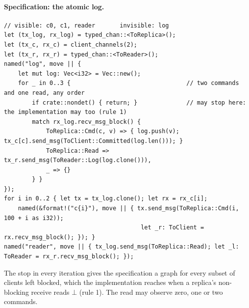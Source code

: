 \documentclass[11pt,a4paper]{article}
\begin{document}
\paragraph{Specification: the atomic log.}
\begin{lstlisting}
// visible: c0, c1, reader       invisible: log
let (tx_log, rx_log) = typed_chan::<ToReplica>();
let (tx_c, rx_c) = client_channels(2);
let (tx_r, rx_r) = typed_chan::<ToReader>();
named("log", move || {
    let mut log: Vec<i32> = Vec::new();
    for _ in 0..3 {                                 // two commands and one read, any order
        if crate::nondet() { return; }              // may stop here: the implementation may too (rule 1)
        match rx_log.recv_msg_block() {
            ToReplica::Cmd(c, v) => { log.push(v); tx_c[c].send_msg(ToClient::Committed(log.len())); }
            ToReplica::Read => tx_r.send_msg(ToReader::Log(log.clone())),
            _ => {}
        } }
});
for i in 0..2 { let tx = tx_log.clone(); let rx = rx_c[i];
    named(&format!("c{i}"), move || { tx.send_msg(ToReplica::Cmd(i, 100 + i as i32));
                                       let _r: ToClient = rx.recv_msg_block(); }); }
named("reader", move || { tx_log.send_msg(ToReplica::Read); let _l: ToReader = rx_r.recv_msg_block(); });
\end{lstlisting}
The stop in every iteration gives the specification a graph for every subset of clients left
blocked, which the implementation reaches when a replica's non-blocking receive reads $\bot$
(rule 1). The read may observe zero, one or two commands.
\end{document}
